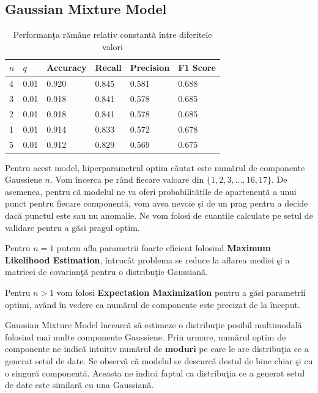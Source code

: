 \noindent

\subsection{Gaussian Mixture Model}

\begin{table}[H]
  \centering
  \begin{tabularx}{\textwidth}{
      |X
      |X
      |X
      |X
      |X
      |X|
  }
  \hline
  $n$ & $q$ & {Accuracy} & {Recall} & {Precision} & {F1 Score} \\
  \hline
  \rowcolor{gray!20} 4 & 0.01 & 0.920 & 0.845 & 0.581 & 0.688  \\
  3	& 0.01 & 0.918	& 0.841 & 0.578 & 0.685 \\
  \rowcolor{gray!20} 2	& 0.01 & 0.918 & 0.841 & 0.578	& 0.685  \\
  1 & 0.01 & 0.914 & 0.833 & 0.572 & 0.678 \\
  \rowcolor{gray!20} 5 & 0.01 & 0.912	& 0.829 & 0.569	& 0.675  \\
  \hline
  \end{tabularx}
  \caption{Performanţa rămâne relativ constantă între diferitele valori}
\end{table}



Pentru acest model, hiperparametrul optim 
căutat este numărul de componente Gaussiene $n$. Vom încerca pe rând fiecare valoare
din $\{1, 2, 3, \ldots, 16, 17\}$. De asemenea, pentru că modelul 
ne va oferi probabilitățile de apartenență a unui punct pentru 
fiecare componentă, vom avea nevoie și de un prag pentru a decide 
dacă punctul este sau nu anomalie. Ne vom folosi de cuantile 
calculate pe setul de validare pentru a găsi pragul optim.

Pentru $n=1$ putem afla parametrii foarte eficient folosind 
\textbf{Maximum Likelihood Estimation}, întrucât problema 
se reduce la aflarea mediei şi a matricei de 
covarianţă pentru o distribuţie Gaussiană. 

Pentru $n > 1$ vom folosi \textbf{Expectation Maximization} 
pentru a găsi parametrii optimi, 
având în vedere ca numărul de componente este precizat de la început.

Gaussian Mixture Model încearcă să estimeze o distribuţie posibil multimodală 
folosind mai multe componente Gaussiene. Prin urmare, numărul optim de componente
ne indică intuitiv numărul de \textbf{moduri} pe care le are distribuţia ce a generat 
setul de date.
Se observă că modelul se descurcă destul de bine chiar şi cu o singură componentă. 
Aceasta ne indică faptul ca distribuţia ce a generat setul de date este 
similară cu una Gaussiană.

